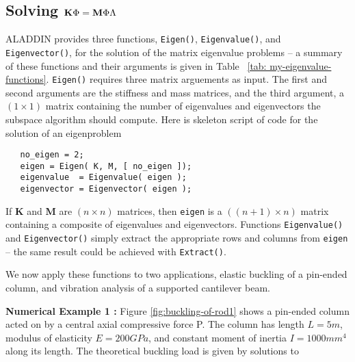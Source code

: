 \subsection{Solving ${\bf K} \Phi = {\bf M} \Phi \Lambda$}

\vspace{0.15 in}
\noindent\hspace{0.5 in}
ALADDIN provides three functions,
{\tt Eigen()}, {\tt Eigenvalue()}, and {\tt Eigenvector()},
for the solution of the matrix eigenvalue problems -- a summary of these
functions and their arguments is given in Table ~\ref{tab: my-eigenvalue-functions}.
{\tt Eigen()} requires three matrix arguements as input.
The first and second arguments are the stiffness and mass matrices,
and the third argument, a $(1 \times 1)$ matrix containing
the number of eigenvalues and eigenvectors the subspace
algorithm should compute. Here is skeleton script
of code for the solution of an eigenproblem

\begin{footnotesize}
\begin{verbatim}
   no_eigen = 2;
   eigen = Eigen( K, M, [ no_eigen ]);
   eigenvalue  = Eigenvalue( eigen );
   eigenvector = Eigenvector( eigen );
\end{verbatim}
\end{footnotesize}

\vspace{0.15 in}\noindent
If {\bf K} and {\bf M} are $(n \times n)$ matrices,
then {\tt eigen} is a $((n+1) \times n)$ matrix
containing a composite of eigenvalues and eigenvectors.
Functions {\tt Eigenvalue()} and {\tt Eigenvector()} simply
extract the appropriate rows and columns from {\tt eigen} -- the
same result could be achieved with {\tt Extract()}.

\vspace{0.15 in}
\noindent\hspace{0.5 in}
We now apply these functions to two applications,
elastic buckling of a pin-ended column,
and vibration analysis of a supported cantilever beam.

\vspace{0.25 in}\noindent
{\bf Numerical Example 1 :} 
Figure \ref{fig:buckling-of-rod1} shows a pin-ended column
acted on by a central axial compressive force P.
The column has length $L = 5m$, modulus of elasticity $E = 200 GPa$,
and constant moment of inertia $I = 1000 mm^4$ along its length.
The theoretical buckling load is given by solutions to 

